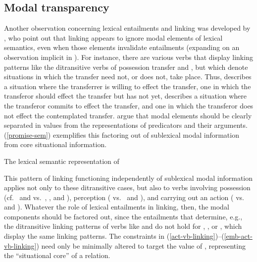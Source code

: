 \documentclass[output=paper
 	        ,biblatex
                ,babelshorthands
                ,newtxmath
                ,draftmode
                ,colorlinks, citecolor=brown
]{langscibook}
\begin{document}
\subsection{Modal transparency}
Another observation concerning lexical entailments and linking was developed by \citet{KoenigandDavis2001}, who point out that linking appears to ignore modal elements of lexical semantics, even when those elements invalidate entailments (expanding on an observation implicit in \citealt{Goldberg1995}).
For instance, there are various  verbs that display linking patterns like the ditransitive verbs of possession transfer  and , but which denote situations in which the transfer need not, or does not, take place.
Thus,  describes a situation where the transferrer is willing to effect the transfer,  one in which the transferor should effect the transfer but has not yet,  describes a situation where the transferor commits to effect the transfer, and  one in which the transferor does not effect the contemplated transfer. 
\citeauthor{KoenigandDavis2001} argue that modal elements should be clearly separated in \content
values from the representations of predicators and their arguments.  (\ref{promise-sem}) exemplifies
this factoring out of sublexical modal information from core situational information. 
\begin{exe}
\ex\label{promise-sem} The lexical semantic representation of  
\citep[101]{KoenigandDavis2001} \\
\end{exe}
This pattern of linking functioning independently of sublexical modal information applies not only to these ditransitive cases, but also to verbs involving possession (cf.\  and  vs.\ , , and ), perception ( vs.\  and ), and carrying out an action ( vs.\  and ).  Whatever the role of lexical entailments in linking, then, the modal components should be factored out, since the entailments that determine, e.g., the ditransitive linking patterns of verbs like  and  do not hold for , , or , which display the same linking patterns. The constraints in (\ref{act-vb-linking})--(\ref{emb-act-vb-linking}) need only be minimally altered to target the value of , representing the ``situational core'' of a relation.
\end{document}
